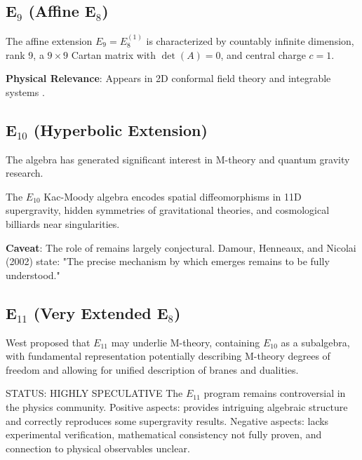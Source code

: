 \subsection{E$_9$ (Affine E$_8$)}

\begin{theorem}[E$_9$ Structure]
The affine extension $E_9 = E_8^{(1)}$ is characterized by countably infinite dimension, rank 9, a $9 \times 9$ Cartan matrix with $\det(A) = 0$, and central charge $c = 1$.
\end{theorem}

\textbf{Physical Relevance}: Appears in 2D conformal field theory and integrable systems \cite{kac1990infinite}.

\subsection{E$_{10}$ (Hyperbolic Extension)}

The  algebra has generated significant interest in M-theory and quantum gravity research.

\begin{theorem}
The $E_{10}$ Kac-Moody algebra encodes spatial diffeomorphisms in 11D supergravity, hidden symmetries of gravitational theories, and cosmological billiards near singularities.
\end{theorem}

\textbf{Caveat}: The role of  remains largely conjectural. Damour, Henneaux, and Nicolai (2002) state: "The precise mechanism by which  emerges remains to be fully understood."

\subsection{E$_{11}$ (Very Extended E$_8$)}

\begin{theorem}
West proposed that $E_{11}$ may underlie M-theory, containing $E_{10}$ as a subalgebra, with fundamental representation potentially describing M-theory degrees of freedom and allowing for unified description of branes and dualities.
\end{theorem}

\begin{factcheck}{STATUS: HIGHLY SPECULATIVE}
The $E_{11}$ program remains controversial in the physics community. Positive aspects: provides intriguing algebraic structure and correctly reproduces some supergravity results. Negative aspects: lacks experimental verification, mathematical consistency not fully proven, and connection to physical observables unclear.
\end{factcheck}

